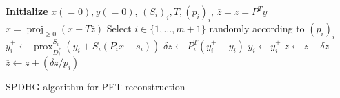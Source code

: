 \documentclass[11pt,twocolumn,twoside]{article}
\DeclareMathOperator{\proj}{proj}
\DeclareMathOperator{\prox}{prox}
\begin{document}
\begin{algorithm}[t]
\begin{algorithmic}[1]
\State \textbf{Initialize} $x(=0),y(=0)$, $(S_i)_i,T,(p_i)_i$,
\State $\overline{z} = z = P^T y$
\Repeat
	\State $x = \proj_{\geq 0} (x - T \overline{z})$
	\State Select $i \in \{ 1,\ldots,m+1\} $ randomly according to $(p_i)_i$
	\State \quad $y_i^+ \gets \prox_{D_i^*}^{S_i} ( y_i + S_i  ( P_i x + s_i))$
	\State \quad $\delta z \gets P_i^T (y_i^+ - y_i)$
	\State \quad $y_i \gets y_i^+$
	\State $z \gets z + \delta z$
	\State $\overline{z} \gets  z + (\delta z/p_i)$
\State {}
\end{algorithmic}
\caption{SPDHG algorithm for PET reconstruction \cite{Ehrhardt2019}}
\label{alg:spdhg}
\end{algorithm}



\clearpage
\printbibliography
\end{document}
